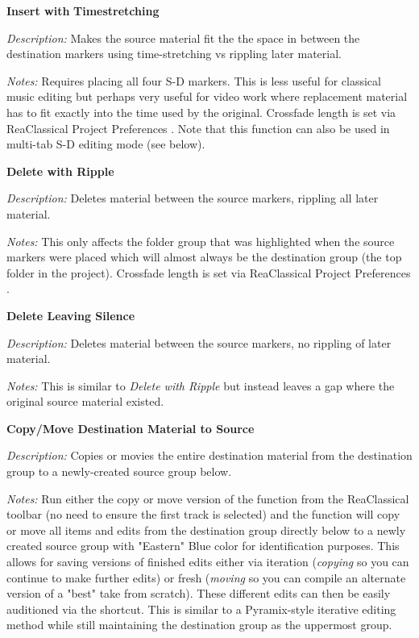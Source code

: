 \documentclass[10pt,american]{article}
\begin{document}
\textbf{Insert with }\textbf{Timestretching}\textbf{ }

\emph{Description: }Makes the source material fit the the space in between the
destination markers using time-stretching vs rippling later material.

\emph{Notes:} Requires placing all four S-D markers. This is less useful for
classical music editing but perhaps very useful for video work where replacement
material has to fit exactly into the time used by the original. Crossfade length
is set via ReaClassical Project Preferences  . Note that this function
can also be used in multi-tab S-D editing mode (see below).

\textbf{Delete with Ripple }\keys{\backspace}

\emph{Description: }Deletes material between the source markers, rippling all
later material.

\emph{Notes:} This only affects the folder group that was highlighted when the
source markers were placed which will almost always be the destination group
(the top folder in the project). Crossfade length is set via ReaClassical
Project Preferences  .

\textbf{Delete Leaving Silence }\keys{\ctrl+\backspace}

\emph{Description:} Deletes material between the source markers, no rippling of
later material.

\emph{Notes:} This is similar to \emph{Delete with Ripple} but instead leaves a
gap where the original source material existed.

\textbf{Copy/Move Destination Material to Source}

\emph{Description:} Copies or movies the entire destination material from the
destination group to a newly-created source group below.

\emph{Notes: }Run either the copy or move version of the function from the ReaClassical
toolbar (no need to ensure the first track is selected) and the function will
copy or move all items and edits from the destination group directly below to a
newly created source group with "Eastern" Blue color for identification
purposes. This allows for saving versions of finished edits either via iteration
(\textit{copying} so you can continue to make further edits) or fresh
(\textit{moving} so you can compile an alternate version of a "best" take from
scratch). These different edits can then be easily auditioned via the 
shortcut. This is similar to a Pyramix-style iterative editing method while
still maintaining the destination group as the uppermost group.
\end{document}
